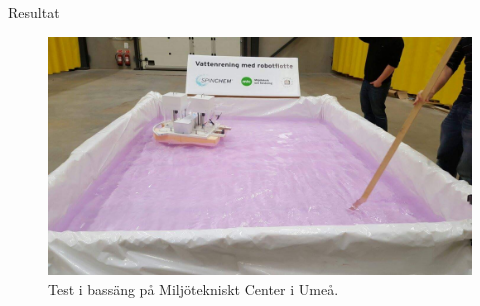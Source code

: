 \documentclass[final]{beamer}
\newlength{\onecolwid}
\begin{document}
\begin{frame}[t]
\begin{columns}[t, totalwidth=\textwidth]
\begin{column}{\onecolwid}
\begin{block}{Resultat}
        \vskip 2cm
        \begin{figure}[H]
          \centering
          \includegraphics[width=\linewidth]{figures/pool.jpeg}
          \caption{Test i bassäng på Miljötekniskt Center i Umeå.}
        \end{figure}
      \end{block}

    \end{column} %

  \end{columns} %

\end{frame} %
\end{document}
